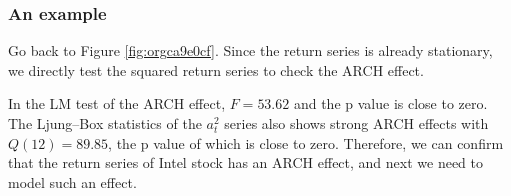 \documentclass[a4paper,11pt]{article}
\begin{document}
\subsubsection*{An example}
\label{sec:org2b65c2c}

Go back to Figure \ref{fig:orgca9e0cf}. Since the return series is
already stationary, we directly test the squared return series to
check the ARCH effect. 

In the LM test of the ARCH effect, \(F = 53.62\) and the p value is
close to zero. The Ljung–Box statistics of the \(a^2_t\) series also
shows strong ARCH effects with \(Q(12) = 89.85\), the p value of which is
close to zero. Therefore, we can confirm that the return series of
Intel stock has an ARCH effect, and next we need to model such an
effect. 
\end{document}
